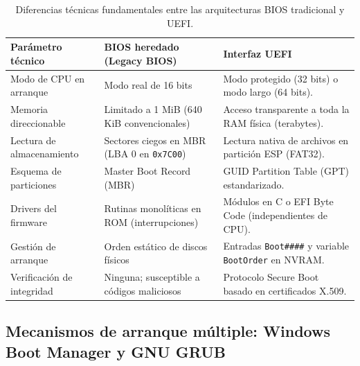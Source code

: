 \documentclass[12pt]{article}
\begin{document}
\begin{table}[H]
\centering
\small
\caption{Diferencias técnicas fundamentales entre las arquitecturas BIOS tradicional y UEFI.}
\label{tab:comparativaBiosUefi}
\begin{tabularx}{\textwidth}{@{} l p{5.5cm} X @{}}
\toprule
\textbf{Parámetro técnico} & \textbf{BIOS heredado (Legacy BIOS)} & \textbf{Interfaz UEFI} \\
\midrule
Modo de CPU en arranque & Modo real de 16 bits & Modo protegido (32 bits) o modo largo (64 bits). \\
Memoria direccionable & Limitado a 1 MiB (640 KiB convencionales) & Acceso transparente a toda la RAM física (terabytes). \\
Lectura de almacenamiento & Sectores ciegos en MBR (LBA 0 en \texttt{0x7C00}) & Lectura nativa de archivos en partición ESP (FAT32). \\
Esquema de particiones & Master Boot Record (MBR) & GUID Partition Table (GPT) estandarizado. \\
Drivers del firmware & Rutinas monolíticas en ROM (interrupciones) & Módulos en C o EFI Byte Code (independientes de CPU). \\
Gestión de arranque & Orden estático de discos físicos & Entradas \texttt{Boot\#\#\#\#} y variable \texttt{BootOrder} en NVRAM. \\
Verificación de integridad & Ninguna; susceptible a códigos maliciosos & Protocolo Secure Boot basado en certificados X.509. \\
\bottomrule
\end{tabularx}
\end{table}

\subsection{Mecanismos de arranque múltiple: Windows Boot Manager y GNU GRUB}
\label{sec:mecanismosArranqueMultiple}
\end{document}
